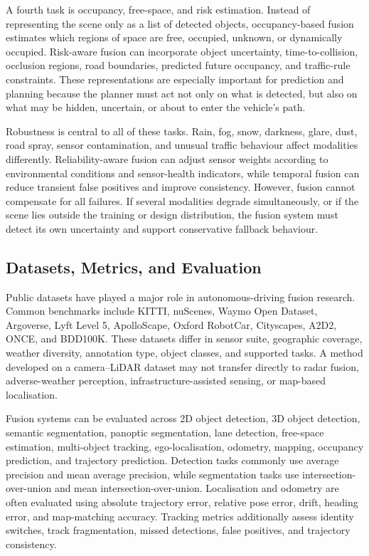\documentclass{ieeeaccess}
\begin{document}
A fourth task is occupancy, free-space, and risk estimation. Instead of representing the scene only as a list of detected objects, occupancy-based fusion estimates which regions of space are free, occupied, unknown, or dynamically occupied. Risk-aware fusion can incorporate object uncertainty, time-to-collision, occlusion regions, road boundaries, predicted future occupancy, and traffic-rule constraints. These representations are especially important for prediction and planning because the planner must act not only on what is detected, but also on what may be hidden, uncertain, or about to enter the vehicle's path.

Robustness is central to all of these tasks. Rain, fog, snow, darkness, glare, dust, road spray, sensor contamination, and unusual traffic behaviour affect modalities differently. Reliability-aware fusion can adjust sensor weights according to environmental conditions and sensor-health indicators, while temporal fusion can reduce transient false positives and improve consistency. However, fusion cannot compensate for all failures. If several modalities degrade simultaneously, or if the scene lies outside the training or design distribution, the fusion system must detect its own uncertainty and support conservative fallback behaviour.

\subsection{Datasets, Metrics, and Evaluation}

Public datasets have played a major role in autonomous-driving fusion research. Common benchmarks include KITTI, nuScenes, Waymo Open Dataset, Argoverse, Lyft Level 5, ApolloScape, Oxford RobotCar, Cityscapes, A2D2, ONCE, and BDD100K. These datasets differ in sensor suite, geographic coverage, weather diversity, annotation type, object classes, and supported tasks. A method developed on a camera--LiDAR dataset may not transfer directly to radar fusion, adverse-weather perception, infrastructure-assisted sensing, or map-based localisation.

Fusion systems can be evaluated across 2D object detection, 3D object detection, semantic segmentation, panoptic segmentation, lane detection, free-space estimation, multi-object tracking, ego-localisation, odometry, mapping, occupancy prediction, and trajectory prediction. Detection tasks commonly use average precision and mean average precision, while segmentation tasks use intersection-over-union and mean intersection-over-union. Localisation and odometry are often evaluated using absolute trajectory error, relative pose error, drift, heading error, and map-matching accuracy. Tracking metrics additionally assess identity switches, track fragmentation, missed detections, false positives, and trajectory consistency.
\end{document}
